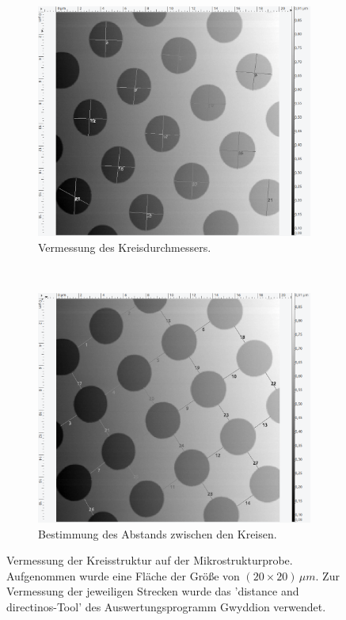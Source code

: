 \begin{figure}[H]
\centering
	\begin{subfigure}[t]{0.45\textwidth}
	\includegraphics[width=\textwidth]{AFM_auswertung/Kreis_durch_vor.png}
	\caption{Vermessung des Kreisdurchmessers.}
	\label{abb:kreisa}
	\end{subfigure}
	~
	\begin{subfigure}[t]{0.45\textwidth}
	\includegraphics[width=\textwidth]{AFM_auswertung/Kreis_abs_vor.png}
	\caption{Bestimmung des Abstands zwischen den Kreisen.}
	\label{abb:kreisb}
	\end{subfigure}
\caption{Vermessung der Kreisstruktur auf der Mikrostrukturprobe. Aufgenommen wurde eine Fl\"ache der Gr\"o{\ss}e von $(20 \times 20) \, \mu m$. Zur Vermessung der jeweiligen Strecken wurde das 'distance and directinos-Tool' des Auswertungsprogramm Gwyddion verwendet.}
\label{abb:kreis}
\end{figure}
